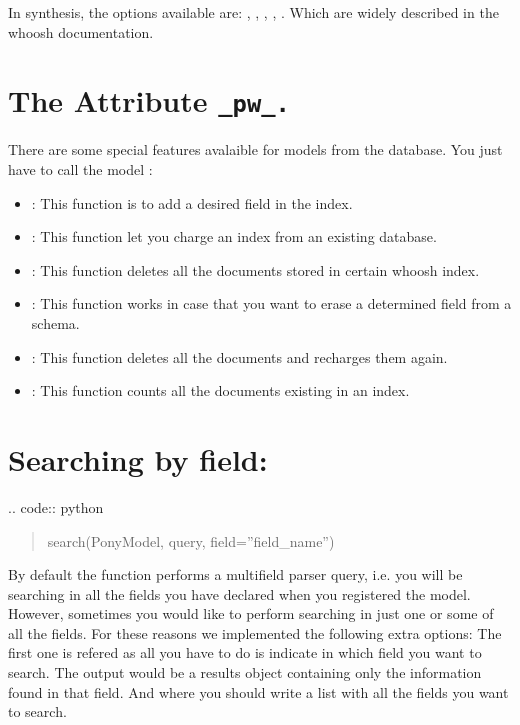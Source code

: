 \documentclass[letterpaper,10pt,english]{sphinxmanual}
\begin{document}
In synthesis, the options available are: , , , , . Which are widely described in the whoosh documentation.


\section{The Attribute \texttt{\_pw\_.}}
\label{Introduction:the-attribute-pw}
There are some special features avalaible for models from the database. You just have to call the model :
\begin{itemize}
\item {} 
: This function is to add a desired field in the index.

\item {} 
: This function let you charge an index from an  existing database.

\item {} 
: This function deletes all the documents stored in certain whoosh index.

\item {} 
: This function works in case that you want to erase a determined field from a schema.

\item {} 
: This function deletes all the documents and recharges them again.

\item {} 
: This function counts all the documents existing in an index.

\end{itemize}


\section{Searching by field:}
\label{Introduction:searching-by-field}
\href{https://pypi.python.org/pypi/Flask-PonyWhoosh}{}
.. code:: python
\begin{quote}

search(PonyModel, query, field=''field\_name'')
\end{quote}

By default the function  performs a multifield parser query, i.e.  you will be searching in all the fields you have declared when you registered the model. However, sometimes you would like to perform searching in just one or some of all the fields.
For these reasons we implemented the following extra options: The first one is refered as  all you have to do is indicate in which field you want to search. The output would be a results object containing only the information found in that field. And  where you should write a list with all the fields you want to search.
\end{document}
